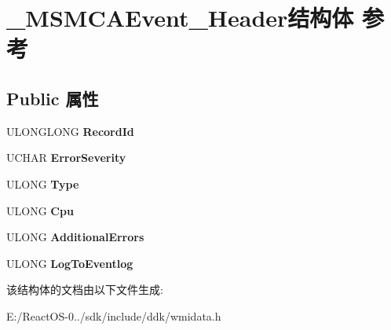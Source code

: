 \hypertarget{struct___m_s_m_c_a_event___header}{}\section{\+\_\+\+M\+S\+M\+C\+A\+Event\+\_\+\+Header结构体 参考}
\label{struct___m_s_m_c_a_event___header}
\subsection*{Public 属性}
\begin{DoxyCompactItemize}
\item 
\mbox{\label{struct___m_s_m_c_a_event___header_a27a773f0f5c78c798ded461dd03d18d7}} 
U\+L\+O\+N\+G\+L\+O\+NG {\bfseries Record\+Id}
\item 
\mbox{\label{struct___m_s_m_c_a_event___header_a3fc957864731c1263bc39aea036c71c9}} 
U\+C\+H\+AR {\bfseries Error\+Severity}
\item 
\mbox{\label{struct___m_s_m_c_a_event___header_a78932f0a924d3dea5d15621fdc075c32}} 
U\+L\+O\+NG {\bfseries Type}
\item 
\mbox{\label{struct___m_s_m_c_a_event___header_a04888deea9f006bdf297f6e4412dd136}} 
U\+L\+O\+NG {\bfseries Cpu}
\item 
\mbox{\label{struct___m_s_m_c_a_event___header_aa8c5d7744ed190f540707f4be0593066}} 
U\+L\+O\+NG {\bfseries Additional\+Errors}
\item 
\mbox{\label{struct___m_s_m_c_a_event___header_a8b2a6a41de80bd63c572da7b3aa82800}} 
U\+L\+O\+NG {\bfseries Log\+To\+Eventlog}
\end{DoxyCompactItemize}


该结构体的文档由以下文件生成\+:\begin{DoxyCompactItemize}
\item 
E\+:/\+React\+O\+S-\/0../sdk/include/ddk/wmidata.\+h\end{DoxyCompactItemize}
